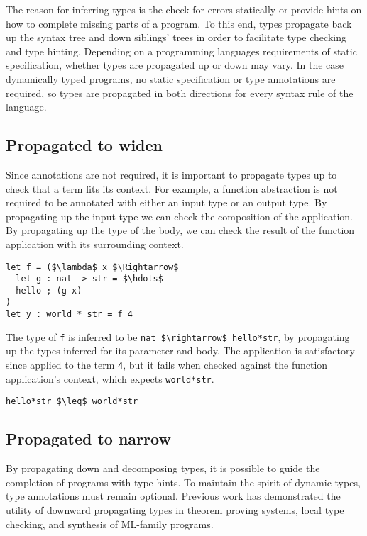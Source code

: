 \documentclass[sigplan]{acmart}
\theoremstyle{definition}
\begin{document}
The reason for inferring types is the check for errors statically or 
provide hints on how to complete missing parts of a program. To this end,
types propagate back up the syntax tree and down siblings' trees in order
to facilitate type checking and type hinting.
Depending on a programming languages requirements of static specification, 
whether types are propagated up or down may vary. 
In the case dynamically typed programs, no static specification or type annotations
are required, so types are propagated in both directions for every syntax rule
of the language.


\subsection{Propagated to widen}
Since annotations are not required, it is important to propagate types up to check
that a term fits its context.
For example, a function abstraction is not required to be annotated 
with either an input type or an output type. 
\noindent By propagating up the input type we can check the composition of the application.
By propagating up the type of the body, we can check the result of the function application 
with its surrounding context. 

\begin{lstlisting}
let f = ($\lambda$ x $\Rightarrow$ 
  let g : nat -> str = $\hdots$
  hello ; (g x)
) 
let y : world * str = f 4
\end{lstlisting}

The type of \lstinline{f} is inferred to be \lstinline{nat $\rightarrow$ hello*str}, 
by propagating up the types inferred for its parameter and body.
The application is satisfactory since applied to the term \lstinline{4}, 
but it fails when checked against the function application's context,
which expects \lstinline{world*str}.
\begin{lstlisting}
hello*str $\leq$ world*str
\end{lstlisting}

\subsection{Propagated to narrow}
By propagating down and decomposing types, 
it is possible to guide the completion of programs with type hints.
To maintain the spirit of dynamic types, type annotations must remain optional.
Previous work has demonstrated the utility of downward propagating types 
in theorem proving systems, local type checking, 
and synthesis of ML-family programs.
\end{document}
